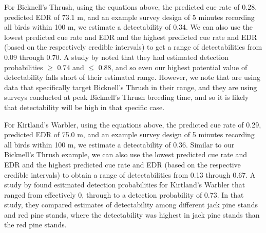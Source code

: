 \documentclass[12pt]{article}
\begin{document}
\par For Bicknell's Thrush, using the equations above, the predicted cue rate of 0.28, predicted EDR of 73.1 m, and an example survey design of 5 minutes recording all birds within 100 m, we estimate a detectability of 0.34.
We can also use the lowest predicted cue rate and EDR and the highest predicted cue rate and EDR (based on the respectively credible intervals) to get a range of detectabilities from 0.09 through 0.70.
A study by \citet{aubry_bicknells_2018} noted that they had estimated detection probabilities $\geq$ 0.74 and $\leq$ 0.88, and so even our highest potential value of detectability falls short of their estimated range.
However, we note that \citet{aubry_bicknells_2018} are using data that specifically target Bicknell's Thrush in their range, and they are using surveys conducted at peak Bicknell's Thrush breeding time, and so it is likely that detectability will be high in that specific case.

\par For Kirtland's Warbler, using the equations above, the predicted cue rate of 0.29, predicted EDR of 75.0 m, and an example survey design of 5 minutes recording all birds within 100 m, we estimate a detectability of 0.36.
Similar to our Bicknell's Thrush example, we can also use the lowest predicted cue rate and EDR and the highest predicted cue rate and EDR (based on the respective credible intervals) to obtain a range of detectabilities from 0.13 through 0.67.
A study by \citet{van_dyke_comparative_2022} found esitmated detection probabilities for Kirtland's Warbler that ranged from effectively 0, through to a detection probability of 0.73.
In that study, they compared estimates of detectability among different jack pine stands and red pine stands, where the detectability was highest in jack pine stands than the red pine stands.
\end{document}
